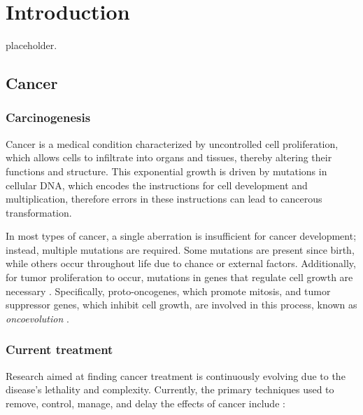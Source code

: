 \chapter{Introduction} \label{chap:introduction}

placeholder. 

\section{Cancer}

\subsection{Carcinogenesis}

Cancer is a medical condition characterized by uncontrolled cell proliferation, which allows cells to infiltrate into organs and tissues, thereby altering their functions and structure. This exponential growth is driven by mutations in cellular DNA, which encodes the instructions for cell development and multiplication, therefore errors in these instructions can lead to cancerous transformation.

In most types of cancer, a single aberration is insufficient for cancer development; instead, multiple mutations are required. Some mutations are present since birth, while others occur throughout life due to chance or external factors. Additionally, for tumor proliferation to occur, mutations in genes that regulate cell growth are necessary \cite{Vogelstein2004}. Specifically, proto-oncogenes, which promote mitosis, and tumor suppressor genes, which inhibit cell growth, are involved in this process, known as \textit{oncoevolution} \cite{carcinogenesis}. 

\subsection{Current treatment}

Research aimed at finding cancer treatment is continuously evolving due to the disease's lethality and complexity. Currently, the primary techniques used to remove, control, manage, and delay the effects of cancer include \cite{cancer_treat}:

